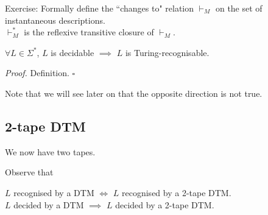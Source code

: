 \documentclass[a4paper]{article}
\newenvironment{proof}{\begin{breakbox}\textit{Proof.}}{\hfill$\square$\end{breakbox}}
\newcommand{\nl}{\vspace{0.2cm}\\}
\newcommand{\changesto}{\vdash}
\begin{document}
    Exercise: Formally define the ``changes to" relation $\changesto_M$ on the set of instantaneous descriptions.\nl
    $\changesto^*_M$ is the reflexive transitive closure of $\changesto_M$.\nl

    \begin{claim}
        $\forall L \in \Sigma^*$, $L$ is decidable $\implies$ $L$ is Turing-recognisable.
    \end{claim}
    \begin{proof}
        Definition.
    \end{proof}

    Note that we will see later on that the opposite direction is not true.\nl

    \subsection{2-tape DTM}

    We now have two tapes.

    Observe that

    \begin{theorem}
        $L$ recognised by a DTM $\iff$ $L$ recognised by a 2-tape DTM.\nl
        $L$ decided by a DTM $\implies$ $L$ decided by a 2-tape DTM.
    \end{theorem}
    
\end{document}
